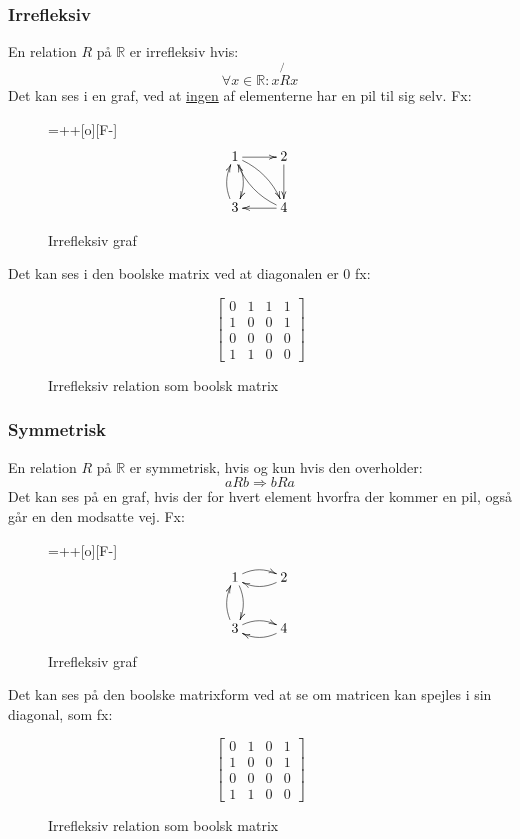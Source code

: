 \documentclass[a4paper]{article}
\begin{document}
  \subsubsection{Irrefleksiv}
    En relation $R$ på $\mathbb{R}$ er irrefleksiv hvis:
    \begin{equation}
      \forall x \in \mathbb{R}: x\not{R}x %
    \end{equation}
    Det kan ses i en graf, ved at \underline{ingen} af elementerne har en pil til sig selv. Fx:
  \begin{figure}[H]
    \entrymodifiers={++[o][F-]}
    $$
    \xymatrix @-0pc {
      1 \ar[r] \ar@/^/[d] \ar@/^/[dr] & 2 \ar[d] \\
      3 \ar@/^/[u] &  4 \ar[l] \ar@/^/[lu]}
      $$
    \caption{Irrefleksiv graf} \label{fig:xy2}
  \end{figure}
  Det kan ses i den boolske matrix ved at diagonalen er $0$ fx:
  \begin{figure}[H]
    $$
    \begin{bmatrix}
      0 & 1 & 1 & 1 \\
      1 & 0 & 0 & 1 \\
      0 & 0 & 0 & 0 \\
      1 & 1 & 0 & 0
    \end{bmatrix}
    $$
    \caption{Irrefleksiv relation som boolsk matrix} \label{fig:bm2}
  \end{figure}
  \subsubsection{Symmetrisk}
    En relation $R$ på $\mathbb{R}$ er symmetrisk, hvis og kun hvis den overholder:
    \begin{equation}
      aRb \Rightarrow bRa
    \end{equation}
    Det kan ses på en graf, hvis der for hvert element hvorfra der kommer en pil, også går en den modsatte vej. Fx:
    \begin{figure}[H]
      \entrymodifiers={++[o][F-]}
      $$
      \xymatrix @-0pc {
        1 \ar@/^/[r] \ar@/^/[d]  & 2 \ar@/^/[l] \\
        3 \ar@/^/[u] \ar@/^/[r] &  4 \ar@/^/[l]  }
        $$
      \caption{Irrefleksiv graf} \label{fig:xy3}
    \end{figure}
    Det kan ses på den boolske matrixform ved at se om matricen kan spejles i sin diagonal, som fx:
    \begin{figure}[H]
      $$
      \begin{bmatrix}
        0 & 1 & 0 & 1 \\
        1 & 0 & 0 & 1 \\
        0 & 0 & 0 & 0 \\
        1 & 1 & 0 & 0
      \end{bmatrix}
      $$
      \caption{Irrefleksiv relation som boolsk matrix} \label{fig:bm3}
    \end{figure}
\end{document}
